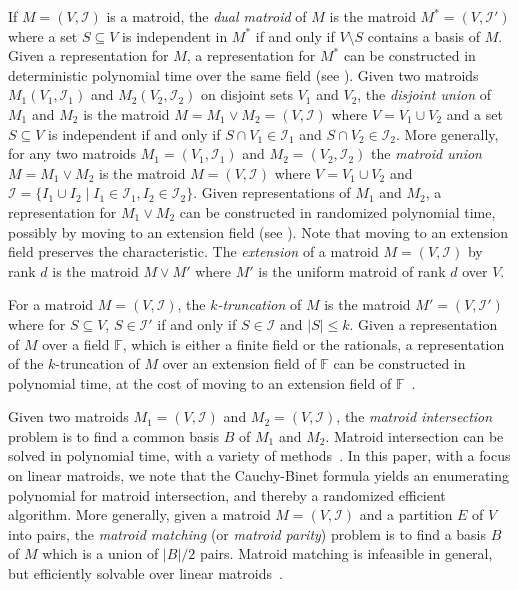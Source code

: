 \documentclass{theoretics}
\newcommand{\F}{\ensuremath{\mathbb F}\xspace}
\newcommand{\cI}{\ensuremath{\mathcal I}\xspace}
\begin{document}
If $M=(V,\cI)$ is a matroid, the \emph{dual matroid} of $M$ is
the matroid $M^*=(V,\cI')$ where a set $S \subseteq V$ is independent
in $M^*$ if and only if $V \setminus S$ contains a basis of $M$. 
Given a representation for $M$, a representation for $M^*$ can be
constructed in deterministic polynomial time over the same field (see \cite{OxleyBook}).  
Given two matroids $M_1(V_1,\cI_1)$ and $M_2(V_2,\cI_2)$ on disjoint
sets $V_1$ and $V_2$, the \emph{disjoint union} of $M_1$ and $M_2$ is
the matroid $M=M_1 \lor M_2=(V,\cI)$ where $V=V_1 \cup V_2$
and a set $S \subseteq V$ is independent if and only if
$S \cap V_1 \in \cI_1$ and $S \cap V_2 \in \cI_2$. 
More generally, for any two matroids $M_1=(V_1,\cI_1)$ and $M_2=(V_2,\cI_2)$
the \emph{matroid union} $M=M_1 \lor M_2$ is the matroid $M=(V,\cI)$
where $V=V_1 \cup V_2$ and $\cI=\{I_1 \cup I_2 \mid I_1 \in \cI_1, I_2 \in \cI_2\}$. 
Given representations of $M_1$ and $M_2$, a representation for $M_1 \lor M_2$
can be constructed in randomized polynomial time, possibly
by moving to an extension field (see \cite{OxleyBook}).  
Note that moving to an extension field preserves the characteristic.
The \emph{extension} of a matroid $M=(V,\cI)$ by rank $d$ is the matroid $M \lor M'$
where $M'$ is the uniform matroid of rank $d$ over $V$. 

For a matroid $M=(V,\cI)$, the \emph{$k$-truncation} of $M$
is the matroid $M'=(V,\cI')$ where for $S \subseteq V$,
$S \in \cI'$ if and only if $S \in \cI$ and $|S| \leq k$.
Given a representation of $M$ over a field $\F$, which is either
a finite field or the rationals, a representation of
the $k$-truncation of $M$ over an extension field of $\F$
can be constructed in polynomial time, at the cost of moving
to an extension field of $\F$~\cite{LokshtanovMPS18,Marx09-matroid}.

Given two matroids $M_1=(V,\cI)$ and $M_2=(V,\cI)$, the \emph{matroid
  intersection} problem is to find a common basis $B$ of $M_1$ and $M_2$.
Matroid intersection can be solved in polynomial time, with a variety
of methods~\cite{Schrijver}. In this paper, with a focus on linear
matroids, we note that the Cauchy-Binet formula yields an enumerating
polynomial for matroid intersection, and thereby a randomized
efficient algorithm. More generally, given a matroid $M=(V,\cI)$
and a partition $E$ of $V$ into pairs, the \emph{matroid matching}
(or \emph{matroid parity}) problem is to find a basis $B$ of $M$
which is a union of $|B|/2$ pairs. Matroid matching is infeasible in
general, but efficiently solvable over linear matroids~\cite{Lovasz79,Schrijver}.
\end{document}
